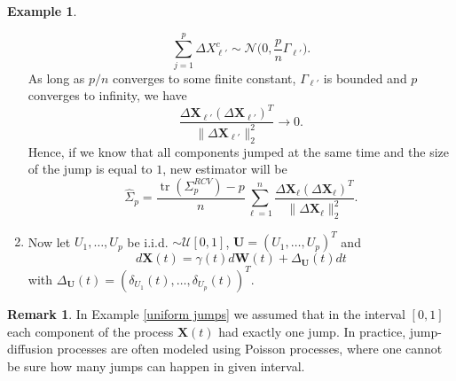 \documentclass[a4paper,11pt]{article}
\theoremstyle{plain}
\theoremstyle{definition}
\newtheorem{exmp}[thm]{Example}
\newtheorem{rmrk}[thm]{Remark}
\newcommand{\tr}{\operatorname{tr}}
\begin{document}
\begin{exmp}
\begin{enumerate}
    		\[ \sum_{j=1}^{p} \Delta X^c_{\ell'} \sim \mathcal{N}\Big(0, \frac{p}{n}\Gamma_{\ell'}\Big). \]
    		As long as $p/n$ converges to some finite constant, $\Gamma_{\ell'}$ is bounded and $p$ converges to infinity, we have
    		\[ 
    		\frac{\Delta \mathbf{X}_{\ell'}(\Delta \mathbf{X}_{\ell'})^T}{\| \Delta \mathbf{X}_{\ell'} \|_2^2} \rightarrow 0.
    		\]
    		Hence, if we know that all components jumped at the same time and the size of the jump is equal to $1$, new estimator will be
    		\[ 
    		\widehat{\Sigma}_p = \frac{\tr(\Sigma_p^{RCV}) - p}{n} \sum_{\ell=1}^{n} \frac{\Delta \mathbf{X}_{\ell}(\Delta \mathbf{X}_{\ell})^T}{\| \Delta \mathbf{X}_{\ell} \|_2^2}.
    		\]
    		
    		\item Now let $U_1, \dots, U_p$ be i.i.d. $\sim \mathcal{U}[0, 1]$, $\mathbf{U} = (U_1, \dots, U_p)^T$ and
    		\[ 
    		d\mathbf{X}(t) = \gamma(t)  d\mathbf{W}(t) + \Delta_\mathbf{U}(t) dt
    		\]
    		with $\Delta_\mathbf{U}(t) = (\delta_{U_1}(t), \dots, \delta_{U_p}(t))^T$.
    	\end{enumerate}
    \end{exmp}
    
    \begin{rmrk}
    	In Example \ref{uniform jumps} we assumed that in the interval $[0, 1]$ each component of the process $\mathbf{X}(t)$ had exactly one jump. In practice, jump-diffusion processes are often modeled using Poisson processes, where one cannot be sure how many jumps can happen in given interval.
    \end{rmrk}
    
\end{document}
